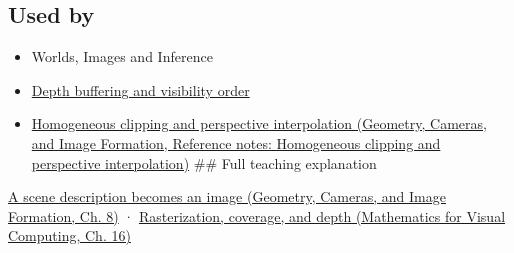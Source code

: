 \subsection{Used by}\label{appendix-ed3f9bc298fe-used-by}

\hypertarget{appendix-ed3f9bc298fe-used-by}{}

\begin{itemize}
\item
  {Worlds, Images and Inference}
\item
  \hyperref[appendix-97578ed97952]{Depth buffering and visibility order}
\item
  \href{../03-Geometry-Cameras-and-Image-Formation/main.pdf\#nameddest=appendix-40426e4b2103}{Homogeneous clipping and perspective interpolation (Geometry, Cameras, and Image Formation, Reference notes: Homogeneous clipping and perspective interpolation)} \#\# Full teaching explanation
\end{itemize}

\href{../03-Geometry-Cameras-and-Image-Formation/main.pdf\#nameddest=03-visual-computing-i-ch001-a-scene-description-becomes-an-image}{A scene description becomes an image (Geometry, Cameras, and Image Formation, Ch. 8)} · \href{../02-Mathematics-for-Visual-Computing/main.pdf\#nameddest=03-visual-computing-i-ch012-rasterization-coverage-and-depth}{Rasterization, coverage, and depth (Mathematics for Visual Computing, Ch. 16)}

